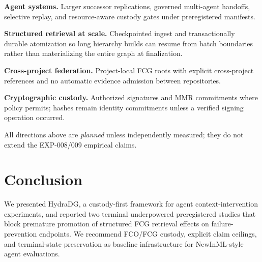 \documentclass{article}
\begin{document}
\textbf{Agent systems.} Larger successor replications, governed multi-agent handoffs, selective replay, and resource-aware custody gates under preregistered manifests.

\textbf{Structured retrieval at scale.} Checkpointed ingest and transactionally durable atomization so long hierarchy builds can resume from batch boundaries rather than materializing the entire graph at finalization.

\textbf{Cross-project federation.} Project-local FCG roots with explicit cross-project references and no automatic evidence admission between repositories.

\textbf{Cryptographic custody.} Authorized signatures and MMR commitments where policy permits; hashes remain identity commitments unless a verified signing operation occurred.

All directions above are \emph{planned} unless independently measured; they do not extend the EXP-008/009 empirical claims.

\section{Conclusion}

We presented HydraDG, a custody-first framework for agent context-intervention experiments, and reported two terminal underpowered preregistered studies that block premature promotion of structured FCG retrieval effects on failure-prevention endpoints.
We recommend FCO/FCG custody, explicit claim ceilings, and terminal-state preservation as baseline infrastructure for NewInML-style agent evaluations.
\end{document}
